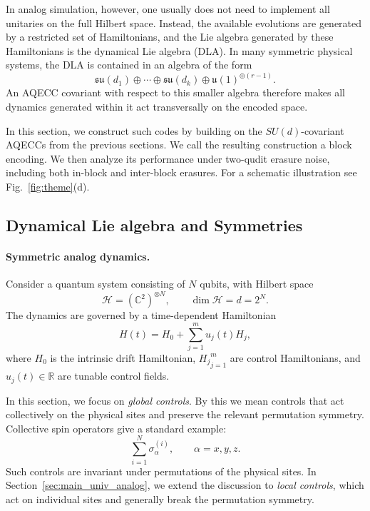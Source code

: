 \documentclass[10pt,twocolumn,superscriptaddress,aps,amsmath,amssymb,citeautoscript,floatfix,prx]{revtex4-2}
\newcounter{alg}
\theoremstyle{plain}
\theoremstyle{plain}
\theoremstyle{plain}
\theoremstyle{plain}
\theoremstyle{plain}
\theoremstyle{plain}
\theoremstyle{plain}
\theoremstyle{definition}
\theoremstyle{plain}
\begin{document}
In analog simulation, however, one usually does not need to implement all unitaries on the full Hilbert space. Instead, the available evolutions are generated by a restricted set of Hamiltonians, and the Lie algebra generated by these Hamiltonians is the dynamical Lie algebra (DLA). In many symmetric physical systems, the DLA is contained in an algebra of the form
$$
\mathfrak{su}(d_1)
\oplus
\cdots
\oplus
\mathfrak{su}(d_k)
\oplus
\mathfrak{u}(1)^{\oplus(r-1)} .
$$
An AQECC covariant with respect to this smaller algebra therefore makes all dynamics generated within it act transversally on the encoded space.

In this section, we construct such codes by building on the $SU(d)$-covariant AQECCs from the previous sections. We call the resulting construction a block encoding. We then analyze its performance under two-qudit erasure noise, including both in-block and inter-block erasures. For a schematic illustration see Fig.~\ref{fig:theme}(d).

\subsection{Dynamical Lie algebra and Symmetries}\label{subsec:main_DLA}

\paragraph{Symmetric analog dynamics.}

Consider a quantum system consisting of $N$ qubits, with Hilbert space
$$
\mathcal H=(\mathbb C^2)^{\otimes N},
\qquad
\dim\mathcal H=d=2^N .
$$
The dynamics are governed by a time-dependent Hamiltonian
\begin{equation}\label{eq:system_ham}
H(t)
=
H_0
+
\sum_{j=1}^m u_j(t)H_j,
\end{equation}
where $H_0$ is the intrinsic drift Hamiltonian, ${H_j}_{j=1}^m$ are control Hamiltonians, and $u_j(t)\in\mathbb R$ are tunable control fields.

In this section, we focus on \textit{global controls}. By this we mean controls that act collectively on the physical sites and preserve the relevant permutation symmetry. 
Collective spin operators give a standard example:
$$
\sum_{i=1}^N \sigma_\alpha^{(i)},
\qquad
\alpha=x,y,z .
$$
Such controls are invariant under permutations of the physical sites. In Section~\ref{sec:main_univ_analog}, we extend the discussion to \textit{local controls}, 
which act on individual sites and generally break the permutation symmetry.
\end{document}
